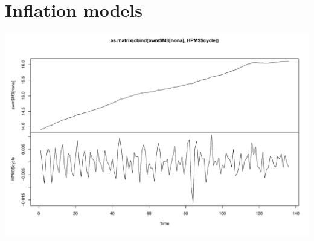 \documentclass[11pt,oneside, a4paper]{amsart}\usepackage[]{graphicx}\usepackage[]{color}
\newenvironment{knitrout}{}{} %
\begin{document}
\section{Inflation models}


\begin{knitrout}
\color{fgcolor}

{\centering \includegraphics[width=\textwidth]{figure/hp_filter-1} 

}



\end{knitrout}






\clearpage
\newpage



\end{document}

